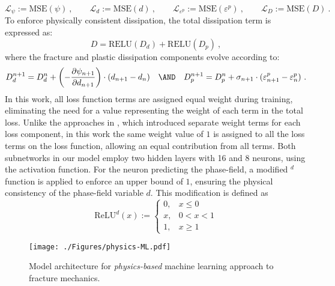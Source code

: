\documentclass[final,3p,times]{elsarticle}
\begin{document}
\begin{equation}
    \mathcal{L}_\psi := \text{MSE}(\psi) \ , \qquad \mathcal{L}_{d} := \text{MSE}(d) \ , \qquad  \mathcal{L}_{\varepsilon^p} := \text{MSE}(\varepsilon^p) \ , \qquad \mathcal{L}_{{D}} := \text{MSE}({D}) \ .
\end{equation}
To enforce physically consistent dissipation, the total dissipation term is expressed as:
\begin{equation}
    {D} = \text{RELU}({D_d}) + \text{RELU}({D_p})\ ,
\end{equation}
where the fracture and plastic dissipation components evolve according to:
\begin{equation}
     D_{d}^{n+1} = D_{d}^{n} + \left(-\frac{\partial \psi_{n+1}}{\partial d_{n+1}}\right) \cdot (d_{n+1}-d_{n})
\quad \AND \quad
    D_{p}^{n+1} = D_{p}^{n} + \sigma_{n+1} \cdot (\varepsilon^p_{n+1} - \varepsilon^p_{n}) \ .
\end{equation}
In this work, all loss function terms are assigned equal weight during training, eliminating the need for a value representing the weight of each term in the total loss. Unlike the approaches in \cite{masi2021thermodynamics,rosenkranz2023}, which introduced separate weight terms for each loss component, in this work the same weight value of $1$ is assigned to all the loss terms on the loss function, allowing an equal contribution from all terms. Both subnetworks in our model employ two hidden layers with 16 and 8 neurons, using the  activation function. For the neuron predicting the phase-field, a modified $^d$ function is applied to enforce an upper bound of $1$, ensuring the physical consistency of the phase-field variable $d$. This modification is defined as 
\begin{equation}
\text{ReLU}^d(x):= \begin{cases} 
0, & x \leq 0 \\
x, & 0 < x < 1 \\
1, & x \geq 1
\end{cases}
\end{equation} 


%
\begin{figure}[t]%
\centering
%
\texttt{[image: ./Figures/physics-ML.pdf]} \;
%
\caption{Model architecture for \emph{physics-based} machine learning approach to fracture mechanics.}
\label{Physics-ML}%
\end{figure}%
%
\end{document}
